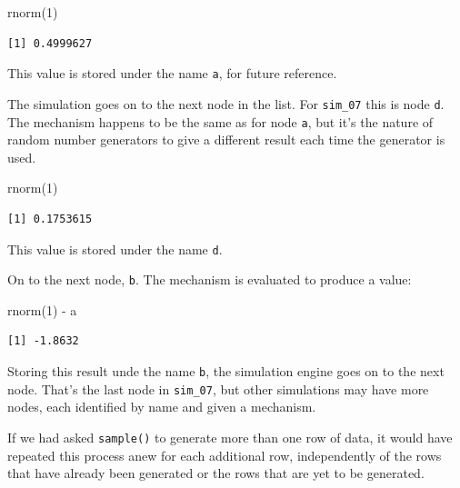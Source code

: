\documentclass[
  letterpaper,
  DIV=11,
  numbers=noendperiod,
  oneside]{scrartcl}
\newenvironment{Shaded}{\begin{snugshade}}{\end{snugshade}}
\newcommand{\DecValTok}[1]{\textcolor[rgb]{0.68,0.00,0.00}{#1}}
\newcommand{\FunctionTok}[1]{\textcolor[rgb]{0.28,0.35,0.67}{#1}}
\newcommand{\NormalTok}[1]{\textcolor[rgb]{0.00,0.23,0.31}{#1}}
\newcommand{\SpecialCharTok}[1]{\textcolor[rgb]{0.37,0.37,0.37}{#1}}
\begin{document}
\begin{Shaded}
\begin{Highlighting}[]
\FunctionTok{rnorm}\NormalTok{(}\DecValTok{1}\NormalTok{)}
\end{Highlighting}
\end{Shaded}

\begin{verbatim}
[1] 0.4999627
\end{verbatim}

This value is stored under the name \texttt{a}, for future reference.

The simulation goes on to the next node in the list. For
\texttt{sim\_07} this is node \texttt{d}. The mechanism happens to be
the same as for node \texttt{a}, but it's the nature of random number
generators to give a different result each time the generator is used.

\begin{Shaded}
\begin{Highlighting}[]
\FunctionTok{rnorm}\NormalTok{(}\DecValTok{1}\NormalTok{)}
\end{Highlighting}
\end{Shaded}

\begin{verbatim}
[1] 0.1753615
\end{verbatim}

This value is stored under the name \texttt{d}.

On to the next node, \texttt{b}. The mechanism is evaluated to produce a
value:

\begin{Shaded}
\begin{Highlighting}[]
\FunctionTok{rnorm}\NormalTok{(}\DecValTok{1}\NormalTok{) }\SpecialCharTok{{-}}\NormalTok{ a}
\end{Highlighting}
\end{Shaded}

\begin{verbatim}
[1] -1.8632
\end{verbatim}

Storing this result unde the name \texttt{b}, the simulation engine goes
on to the next node. That's the last node in \texttt{sim\_07}, but other
simulations may have more nodes, each identified by name and given a
mechanism.

If we had asked \texttt{sample()} to generate more than one row of data,
it would have repeated this process anew for each additional row,
independently of the rows that have already been generated or the rows
that are yet to be generated.
\end{document}
